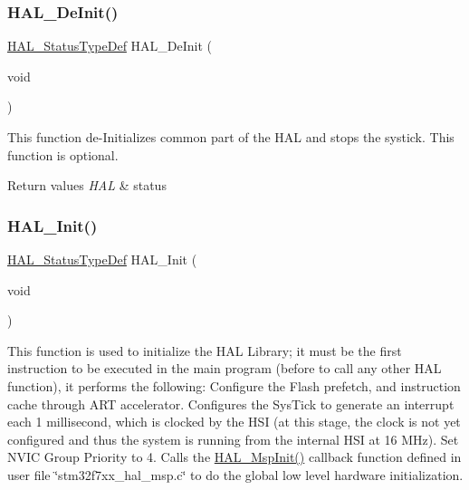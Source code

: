 \subsubsection{\texorpdfstring{HAL\_DeInit()}{HAL\_DeInit()}}
{\footnotesize\ttfamily \mbox{\hyperlink{stm32f7xx__hal__def_8h_a63c0679d1cb8b8c684fbb0632743478f}{H\+A\+L\+\_\+\+Status\+Type\+Def}} H\+A\+L\+\_\+\+De\+Init (\begin{DoxyParamCaption}\item[{void}]{ }\end{DoxyParamCaption})}



This function de-\/\+Initializes common part of the H\+AL and stops the systick. This function is optional. 


\begin{DoxyRetVals}{Return values}
{\em H\+AL} & status \\
\hline
\end{DoxyRetVals}
\mbox{\label{group___h_a_l___exported___functions___group1_gaecac54d350c3730e6831eb404e557dc4}} 
\subsubsection{\texorpdfstring{HAL\_Init()}{HAL\_Init()}}
{\footnotesize\ttfamily \mbox{\hyperlink{stm32f7xx__hal__def_8h_a63c0679d1cb8b8c684fbb0632743478f}{H\+A\+L\+\_\+\+Status\+Type\+Def}} H\+A\+L\+\_\+\+Init (\begin{DoxyParamCaption}\item[{void}]{ }\end{DoxyParamCaption})}



This function is used to initialize the H\+AL Library; it must be the first instruction to be executed in the main program (before to call any other H\+AL function), it performs the following\+: Configure the Flash prefetch, and instruction cache through A\+RT accelerator. Configures the Sys\+Tick to generate an interrupt each 1 millisecond, which is clocked by the H\+SI (at this stage, the clock is not yet configured and thus the system is running from the internal H\+SI at 16 M\+Hz). Set N\+V\+IC Group Priority to 4. Calls the \mbox{\hyperlink{group___h_a_l___exported___functions___group1_ga07e099a69ab23e79be8b7a80505de519}{H\+A\+L\+\_\+\+Msp\+Init()}} callback function defined in user file \char`\"{}stm32f7xx\+\_\+hal\+\_\+msp.\+c\char`\"{} to do the global low level hardware initialization. 

